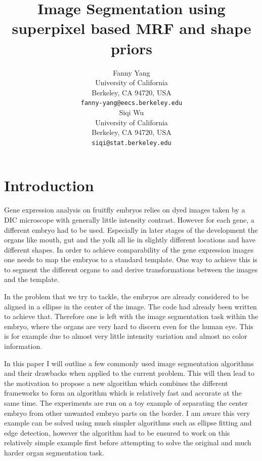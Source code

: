 \documentclass{article} %
\begin{document}
\title{Image Segmentation using superpixel based MRF and shape priors}

\author{
Fanny Yang\\
University of California\\
Berkeley, CA 94720, USA\\
\texttt{fanny-yang@eecs.berkeley.edu} \\
\And
Siqi Wu\\
University of California\\
Berkeley, CA 94720, USA\\
\texttt{siqi@stat.berkeley.edu}\\
}

\maketitle

\section{Introduction}
Gene expression analysis on fruitfly embryos relies on dyed images taken by a DIC microscope with generally little intensity contrast. However for each gene, a different embryo had to be used. Especially in later stages of the development the organs like mouth, gut and the yolk all lie in slightly different locations and have different shapes. In order to achieve comparability of the gene expression images one needs to map the embryos to a standard template. One way to achieve this is to segment the different organs to and derive transformations between the images and the template. 

In the problem that we try to tackle, the embryos are already considered to be aligned in a ellipse in the center of the image. The code had already been written to achieve that. Therefore one is left with the image segmentation task within the embryo, where the organs are very hard to discern even for the human eye. This is for example due to almost very little intensity variation and almost no color information.

In this paper I will outline a few commonly used image segmentation algorithms and their drawbacks when applied to the current problem. This will then lead to the motivation to propose a new algorithm which combines the different frameworks to form an algorithm which is relatively fast and accurate at the same time. The experiments are run on a toy example of separating the center embryo from other unwanted embryo parts on the border. I am aware this very example can be solved using much simpler algorithms such as ellipse fitting and edge detection, however the algorithm had to be ensured to work on this relatively simple example first before attempting to solve the original and much harder organ segmentation task.
\end{document}
